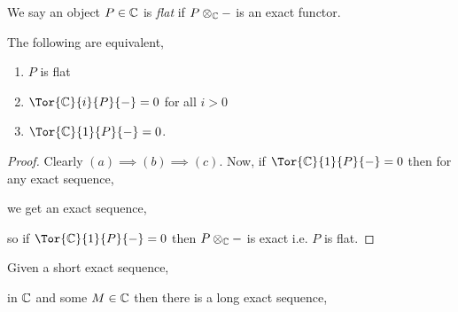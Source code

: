 \documentclass[12pt]{article}
\begin{document}
\begin{defn}
We say an object $P \in \mathbb{C}$ is \textit{flat} if $P \otimes_{\mathbb{C}} - $ is an exact functor.
\end{defn}

\begin{lemma}
The following are equivalent,
\begin{enumerate}
\item $P$ is flat
\item $\Tor{\C}{i}{P}{-} = 0$ for all $i > 0$
\item $\Tor{\C}{1}{P}{-} = 0$.
\end{enumerate}
\end{lemma}

\begin{proof}
Clearly $(a) \implies (b) \implies (c)$. Now, if $\Tor{\C}{1}{P}{-} = 0$ then for any exact sequence,
\begin{center}
\end{center}
we get an exact sequence,
\begin{center}
\end{center}
so if $\Tor{\C}{1}{P}{-} = 0$ then $P \otimes_{\mathbb{C}} -$ is exact i.e. $P$ is flat.
\end{proof}


\begin{prop}
Given a short exact sequence,
\begin{center}
\end{center}
in $\mathbb{C}$ and some $M \in \mathbb{C}$ then there is a long exact sequence, 
\begin{center}
\end{center}
\end{prop}
\end{document}
